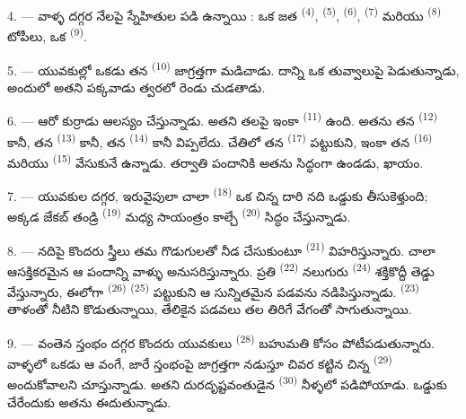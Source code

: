 4. --- వాళ్ళ దగ్గర నేలపై స్నేహితుల  పడి ఉన్నాయి : ఒక జత 
\textsuperscript{(4)},  \textsuperscript{(5)}, 
\textsuperscript{(6)},  \textsuperscript{(7)} మరియు 
\textsuperscript{(8)} టోపీలు, ఒక  \textsuperscript{(9)}.

5. --- యువకుల్లో ఒకడు తన  \textsuperscript{(10)} జాగ్రత్తగా మడిచాడు. దాన్ని ఒక
తువ్వాలుపై పెడుతున్నాడు, అందులో అతని పక్కవాడు త్వరలో రెండు  చుడతాడు.

6. --- ఆరో కుర్రాడు ఆలస్యం చేస్తున్నాడు. అతని తలపై ఇంకా 
\textsuperscript{(11)} ఉంది. అతను తన  \textsuperscript{(12)} కానీ, తన
 \textsuperscript{(13)} కానీ, తన  \textsuperscript{(14)} కానీ
విప్పలేదు. చేతిలో తన  \textsuperscript{(17)} పట్టుకుని, ఇంకా తన
 \textsuperscript{(16)} మరియు  \textsuperscript{(15)}
వేసుకునే ఉన్నాడు. తర్వాతి పందానికి అతను సిద్ధంగా ఉండడు, ఖాయం.

7. --- యువకుల దగ్గర, ఇరువైపులా చాలా  \textsuperscript{(18)} ఒక చిన్న
దారి నది ఒడ్డుకు తీసుకెళ్తుంది; అక్కడ జేకబ్ తండ్రి  \textsuperscript{(19)} మధ్య
సాయంత్రం కాల్చే  \textsuperscript{(20)} సిద్ధం చేస్తున్నాడు.

\VUsaut{4.4mm}
\VUsaut{3.4mm}

8. --- నదిపై కొందరు స్త్రీలు తమ గొడుగులతో నీడ చేసుకుంటూ  \textsuperscript{(21)}
విహరిస్తున్నారు. చాలా ఆసక్తికరమైన ఆ పందాన్ని వాళ్ళు అనుసరిస్తున్నారు. ప్రతి
 \textsuperscript{(22)} నలుగురు 
\textsuperscript{(24)} శక్తికొద్దీ తెడ్డు వేస్తున్నారు, ఈలోగా 
\textsuperscript{(26)}  \textsuperscript{(25)} పట్టుకుని ఆ సున్నితమైన పడవను
నడిపిస్తున్నాడు.  \textsuperscript{(23)} తాళంతో నీటిని కొడుతున్నాయి, తేలికైన
పడవలు తల తిరిగే వేగంతో సాగుతున్నాయి.

9. --- వంతెన స్తంభం దగ్గర కొందరు యువకులు  \textsuperscript{(28)} బహుమతి
కోసం పోటీపడుతున్నారు. వాళ్ళలో ఒకడు ఆ వంగే, జారే స్తంభంపై జాగ్రత్తగా నడుస్తూ చివర కట్టిన చిన్న
 \textsuperscript{(29)} అందుకోవాలని చూస్తున్నాడు. అతని దురదృష్టవంతుడైన
 \textsuperscript{(30)} నీళ్ళలో పడిపోయాడు. ఒడ్డుకు చేరేందుకు అతను
ఈదుతున్నాడు.


